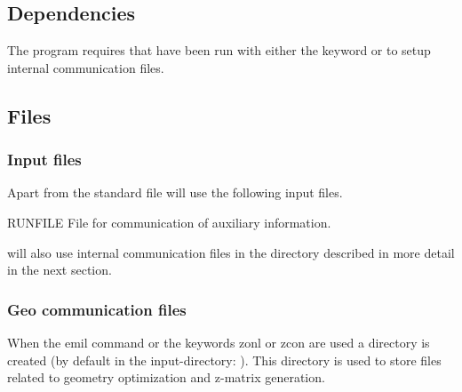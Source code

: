 \subsection{Dependencies}
\label{UG:sec:Geo_dependencies}

The  program requires that  have been run with
either the keyword  or  to setup internal
communication files. 

\subsection{Files}
\label{UG:sec:Geo_files}

\subsubsection{Input files}
Apart from the standard file  will use the following input files.
\begin{filelist}
\item[RUNFILE]
File for communication of auxiliary information.
\end{filelist}
 will also use internal communication files in the directory
 described in more detail in the next section.


\subsubsection{Geo communication files}
When the emil command  or the keywords zonl or zcon
 are used a directory
  is created (by default in the input-directory:
).
 This directory
 is used to store files related to geometry optimization and z-matrix generation.

